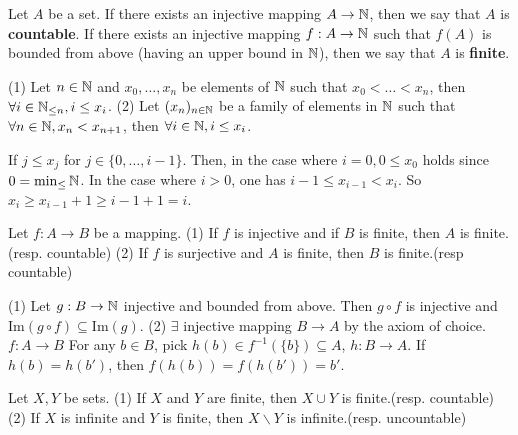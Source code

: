 \begin{definitionenv}
    Let $A$ be a set. If there exists an injective mapping $A\rightarrow \mathbb{N}$,  then we say that $A$ is \textbf{countable}.
    If  there exists an injective mapping $f:A\rightarrow \mathbb{N}$ such that $f(A)$ is bounded from above (having an upper bound in $\mathbb{N}$),  then we say that $A$ is \textbf{finite}.
\end{definitionenv}
\begin{lemmaenv}\label{4.9.8}
    \quad
    \newline
    (1) Let $n\in \mathbb{N}$ and $x_0, \dots , x_n$ be elements of $\mathbb{N}$ such that $x_0<\dots<x_n$,  then $\forall i\in \mathbb{N}_{\leq n}, i\leq x_i$.
    \newline
    (2) Let $(x_n)_{n\in \mathbb{N}}$ be a family of elements in $\mathbb{N}$ such that $\forall n\in \mathbb{N}, x_n<x_{n+1}$,  then $\forall i\in \mathbb{N}, i\le x_i$.
\end{lemmaenv}
\begin{proofenv}
    If $j\le x_j$ for $j\in \{0, \dots, i-1\}$. Then,  in the case where $i=0, 0\le x_0$ holds since $0=\min_\le \mathbb{N}$. In the case where $i>0$,  one has $i-1\le x_{i-1}<x_i$. So $x_i\ge x_{i-1}+1\ge i-1+1=i$.
\end{proofenv}
\begin{propositionenv}
    Let $f:A\rightarrow B$ be a mapping.
    \newline
    (1) If $f$ is injective and if $B$ is finite,  then $A$ is finite.(resp. countable)
    \newline
    (2) If $f$ is surjective and $A$ is finite,  then $B$ is finite.(resp countable)
\end{propositionenv}
\begin{proofenv}
    \quad
    \newline
    (1) Let $g:B\rightarrow \mathbb{N}$ injective and bounded from above. Then $g\circ f$ is injective and $\mathrm{Im}(g\circ f)\subseteq \mathrm{Im}(g)$.
    \newline
    (2) $\exists$ injective mapping $B\rightarrow A$ by the axiom of choice. $f:A\rightarrow B$ For any $b\in B$,  pick $h(b)\in f^{-1}(\{b\})\subseteq A$, $h:B\rightarrow A$. If $h(b)=h(b')$,  then $f(h(b))=f(h(b'))=b'$.
\end{proofenv}
\begin{propositionenv}
    Let $X, Y$ be sets.
    \newline
    (1) If $X$ and $Y$ are finite,  then $X\cup Y$ is finite.(resp. countable)
    \newline
    (2) If $X$ is infinite and $Y$ is finite,  then $X\backslash Y$ is infinite.(resp. uncountable)
\end{propositionenv}
